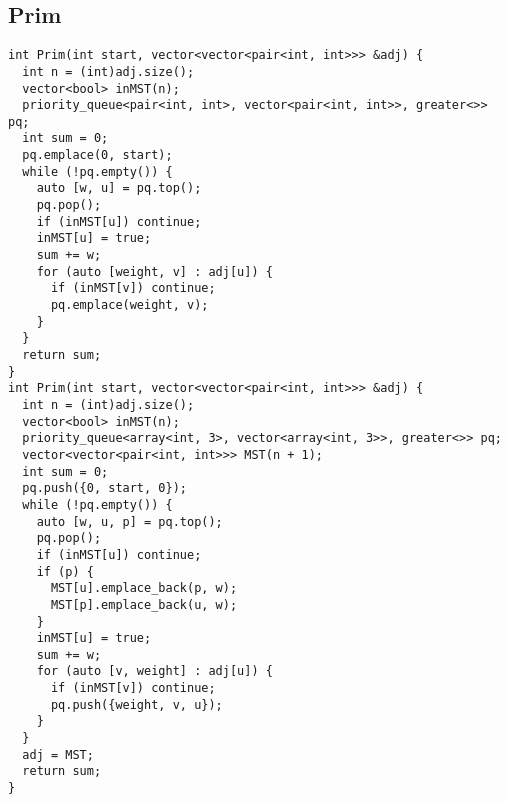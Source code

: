 \documentclass[twoside]{article}
\begin{document}
\begin{multicols*}{2}
\begin{verbatim}
\end{verbatim}

{
\subsection*{Prim}
}
\begin{verbatim}
int Prim(int start, vector<vector<pair<int, int>>> &adj) {
  int n = (int)adj.size();
  vector<bool> inMST(n);
  priority_queue<pair<int, int>, vector<pair<int, int>>, greater<>> pq;
  int sum = 0;
  pq.emplace(0, start);
  while (!pq.empty()) {
    auto [w, u] = pq.top();
    pq.pop();
    if (inMST[u]) continue;
    inMST[u] = true;
    sum += w;
    for (auto [weight, v] : adj[u]) {
      if (inMST[v]) continue;
      pq.emplace(weight, v);
    }
  }
  return sum;
}
int Prim(int start, vector<vector<pair<int, int>>> &adj) {
  int n = (int)adj.size();
  vector<bool> inMST(n);
  priority_queue<array<int, 3>, vector<array<int, 3>>, greater<>> pq;
  vector<vector<pair<int, int>>> MST(n + 1);
  int sum = 0;
  pq.push({0, start, 0});
  while (!pq.empty()) {
    auto [w, u, p] = pq.top();
    pq.pop();
    if (inMST[u]) continue;
    if (p) {
      MST[u].emplace_back(p, w);
      MST[p].emplace_back(u, w);
    }
    inMST[u] = true;
    sum += w;
    for (auto [v, weight] : adj[u]) {
      if (inMST[v]) continue;
      pq.push({weight, v, u});
    }
  }
  adj = MST;
  return sum;
}
\end{verbatim}

{
}
\end{multicols*}
\end{document}
